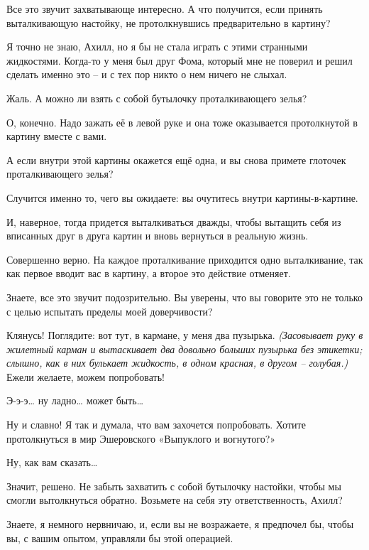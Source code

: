 \documentclass[../main.tex]{subfiles}
\begin{document}
\begin{Dialogue}
\begin{sublevel}
 Все это звучит захватывающе интересно. А что получится, если принять выталкивающую настойку, не протолкнувшись предварительно в картину?

 Я точно не знаю, Ахилл, но я бы не стала играть с этими странными жидкостями. Когда-то у меня был друг Фома, который мне не поверил и решил сделать именно это \--- и с тех пор никто о нем ничего не слыхал.

 Жаль. А можно ли взять с собой бутылочку проталкивающего зелья?

 О, конечно. Надо зажать её в левой руке и она тоже оказывается протолкнутой в картину вместе с вами.

 А если внутри этой картины окажется ещё одна, и вы снова примете глоточек проталкивающего зелья?

 Случится именно то, чего вы ожидаете: вы очутитесь внутри картины-в-картине.

 И, наверное, тогда придется выталкиваться дважды, чтобы вытащить себя из вписанных друг в друга картин и вновь вернуться в реальную жизнь.

 Совершенно верно. На каждое проталкивание приходится одно выталкивание, так как первое вводит вас в картину, а второе это действие отменяет.

 Знаете, все это звучит подозрительно. Вы уверены, что вы говорите это не только с целью испытать пределы моей доверчивости?

 Клянусь! Поглядите: вот тут, в кармане, у меня два пузырька. \emph{(Засовывает руку в жилетный карман и вытаскивает два довольно больших пузырька без этикетки; слышно, как в них булькает жидкость, в одном красная, в другом \--- голубая.)} Ежели желаете, можем попробовать!

 Э-э-э\ldots{} ну ладно\ldots{} может быть\ldots{}

 Ну и славно! Я так и думала, что вам захочется попробовать. Хотите протолкнуться в мир Эшеровского «Выпуклого и вогнутого?»

 Ну, как вам сказать\ldots{}

 Значит, решено. Не забыть захватить с собой бутылочку настойки, чтобы мы смогли вытолкнуться обратно. Возьмете на себя эту ответственность, Ахилл?

 Знаете, я немного нервничаю, и, если вы не возражаете, я предпочел бы, чтобы вы, с вашим опытом, управляли бы этой операцией.


\end{sublevel}
\end{Dialogue}
\end{document}
